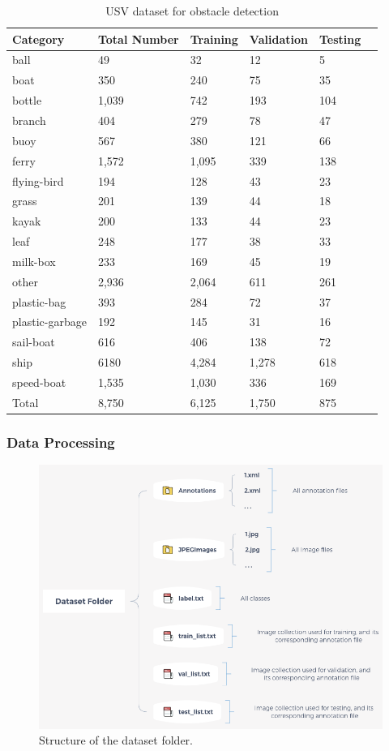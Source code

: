 \documentclass[sensors,article,submit,moreauthors,pdftex]{Definitions/mdpi}
\begin{document}
\begin{table}[htbp]
\centering
\caption{USV dataset for obstacle detection}
\begin{tabular}{llllll} 
\toprule
\textbf{Category}&\textbf{Total Number}&\textbf{Training}&\textbf{Validation}&\textbf{Testing}\\
\midrule
ball& 49& 32& 12& 5 \\
boat& 350& 240& 75& 35 \\
bottle& 1,039& 742& 193& 104 \\
branch& 404& 279& 78& 47 \\
buoy& 567& 380& 121& 66 \\
ferry& 1,572& 1,095& 339& 138 \\
flying-bird& 194& 128& 43& 23 \\
grass& 201& 139& 44& 18 \\
kayak& 200& 133& 44& 23 \\
leaf& 248& 177& 38& 33 \\
milk-box& 233& 169& 45& 19 \\
other& 2,936& 2,064& 611& 261 \\
plastic-bag& 393& 284& 72& 37 \\
plastic-garbage& 192& 145& 31& 16 \\
sail-boat& 616& 406& 138& 72 \\
ship& 6180& 4,284& 1,278& 618 \\
speed-boat& 1,535& 1,030& 336& 169 \\
\cmidrule(r){1-5}
Total& 8,750& 6,125& 1,750& 875 \\
\bottomrule
\end{tabular}
\label{tbl:USV dataset for obstacle detection}
\end{table}



\subsubsection{Data Processing}
\begin{figure}[htbp]
\centering
\includegraphics[width=1\columnwidth]{images/dataset-folder.png}
\caption{Structure of the dataset folder.}
\label{fig:Structure of the dataset folder}
\end{figure}
\end{document}
